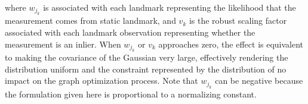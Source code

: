 where $w_{j_k}$ is associated with each landmark representing the likelihood that the measurement comes from static landmark, and $v_k$ is the robust scaling factor associated with each landmark observation representing whether the measurement is an inlier. When $w_{j_k}$ or $v_k$ approaches zero, the effect is equivalent to making the covariance of the Gaussian very large, effectively rendering the distribution uniform and the constraint represented by the distribution of no impact on the graph optimization process. Note that $w_{j_k}$ can be negative because the formulation given here is proportional to a normalizing constant.
